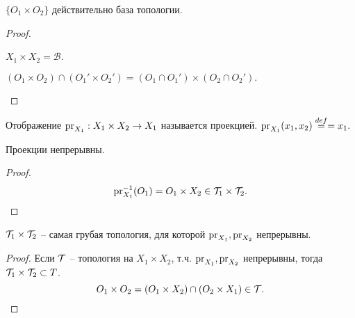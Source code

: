 \begin{proposition}
    $\{O_1 \times O_2\}$ действительно база топологии.
\end{proposition}
\begin{proof}
    \begin{conditions}
        \item $X_1 \times X_2 = \mathcal B$.
        \item $(O_1 \times O_2) \cap (O_1'\times O_2') = (O_1\cap O_1')\times(O_2 \cap O_2').$
    \end{conditions}
\end{proof}

\begin{definition}
    [Проекции]
    Отображение $\operatorname{pr}_{X_1}: X_1\times X_2 \to X_1$ называется проекцией. \(\operatorname{pr}_{X_1}(x_1, x_2) \overset{def}{=} = x_1.\)
\end{definition}

\begin{lemma}
    Проекции непрерывны.
\end{lemma}
\begin{proof}
    \[
    \operatorname{pr}_{X_1}^{-1}(O_1) = O_1 \times X_2 \in \mathcal T_1 \times \mathcal T_2.
    \]
\end{proof}

\begin{proposition}
    $\mathcal T_1 \times \mathcal T_2$ -- самая грубая топология, для которой $\operatorname{pr}_{X_1}, \operatorname{pr}_{X_2}$ непрерывны. 
\end{proposition}

\begin{proof}
    Если $\mathcal T$ -- топология на $X_1 \times X_2$, т.ч. $\operatorname{pr}_{X_1}, \operatorname{pr}_{X_2}$ непрерывны, тогда \(\mathcal T_1 \times \mathcal T_2 \subset T\). \[
    O_1 \times O_2 = (O_1 \times X_2) \cap (O_2 \times X_1) \in \mathcal T.
    \]
\end{proof}